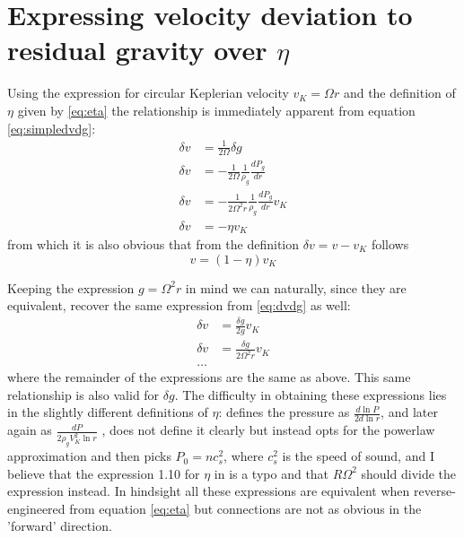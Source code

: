 \documentclass[12pt]{article}
\begin{document}
\newpage
\section{Expressing velocity deviation to residual gravity over $\eta$}
\label{appendix:B}

Using the expression for circular Keplerian velocity $v_K = \Omega r$ and the definition of $\eta$ given by \ref{eq:eta} the relationship is immediately apparent from equation \ref{eq:simpledvdg}:
\begin{align}
    \delta v &= \frac{1}{2\Omega}\delta g \\
    \delta v &= -\frac{1}{2\Omega}\frac{1}{\rho_g}\frac{dP_g}{dr} \\
    \delta v &= -\frac{1}{2\Omega^2r}\frac{1}{\rho_g}\frac{dP_g}{dr} v_K \\
    \delta v &= - \eta v_K
\end{align}
from which it is also obvious that from the definition $\delta v = v-v_K$ follows
\begin{equation}
    v = (1-\eta)v_K
\end{equation}

Keeping the expression $g=\Omega^2 r$ in mind we can naturally, since they are equivalent, recover the same expression from \ref{eq:dvdg} as well: 
\begin{align}
    \delta v &= \frac{\delta g}{2 g} v_K \\
    \delta v &= \frac{\delta g}{2 \Omega^2 r} v_K \\
    \dots& \nonumber
\end{align}
where the remainder of the expressions are the same as above. This same relationship is also valid for $\delta g$. The difficulty in obtaining these expressions lies in the slightly different definitions of $\eta$: \cite{LesHouches} defines the pressure as $\frac{d\ln P}{2d\ln r}$, and later again as $\frac{dP}{2\rho_gV_K^2\ln r}$ \citep{Youdin05}, \cite{Armitage07} does not define it clearly but instead opts for the powerlaw approximation and then picks $P_0=nc_s^2$, where $c_s^2$ is the speed of sound, and I believe that the expression 1.10 for $\eta$ in \cite{Nakagawa86} is a typo and that $R\Omega^2$ should divide the expression instead. In hindsight all these expressions are equivalent when reverse-engineered from equation \ref{eq:eta} but connections are not as obvious in the 'forward' direction.

\newpage


 
\end{document}
